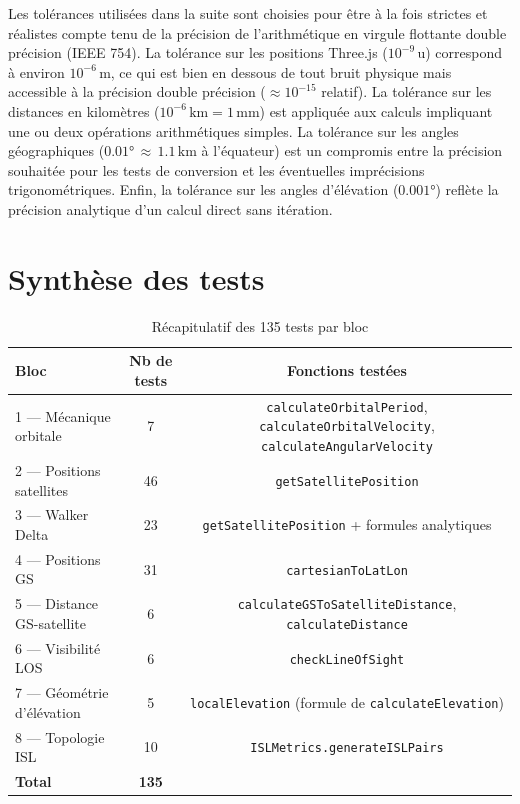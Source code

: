 \documentclass[12pt,a4paper]{article}
\begin{document}
Les tolérances utilisées dans la suite sont choisies pour être à la fois strictes et réalistes compte tenu de la précision de l'arithmétique en virgule flottante double précision (IEEE 754). La tolérance sur les positions Three.js ($10^{-9}$\,u) correspond à environ $10^{-6}\,\text{m}$, ce qui est bien en dessous de tout bruit physique mais accessible à la précision double précision ($\approx 10^{-15}$ relatif). La tolérance sur les distances en kilomètres ($10^{-6}\,\text{km} = 1\,\text{mm}$) est appliquée aux calculs impliquant une ou deux opérations arithmétiques simples. La tolérance sur les angles géographiques ($0.01°\,\approx\,1.1\,\text{km}$ à l'équateur) est un compromis entre la précision souhaitée pour les tests de conversion et les éventuelles imprécisions trigonométriques. Enfin, la tolérance sur les angles d'élévation ($0.001°$) reflète la précision analytique d'un calcul direct sans itération.

\section{Synthèse des tests}

\begin{table}[h!]
\centering
\caption{Récapitulatif des 135 tests par bloc}
\begin{tabular}{lcc}
\toprule
\textbf{Bloc} & \textbf{Nb de tests} & \textbf{Fonctions testées} \\
\midrule
1 — Mécanique orbitale        & 7  & \texttt{calculateOrbitalPeriod}, \texttt{calculateOrbitalVelocity}, \texttt{calculateAngularVelocity} \\
2 — Positions satellites      & 46 & \texttt{getSatellitePosition} \\
3 — Walker Delta              & 23 & \texttt{getSatellitePosition} + formules analytiques \\
4 — Positions GS              & 31 & \texttt{cartesianToLatLon} \\
5 — Distance GS-satellite     & 6  & \texttt{calculateGSToSatelliteDistance}, \texttt{calculateDistance} \\
6 — Visibilité LOS            & 6  & \texttt{checkLineOfSight} \\
7 — Géométrie d'élévation     & 5  & \texttt{localElevation} (formule de \texttt{calculateElevation}) \\
8 — Topologie ISL             & 10 & \texttt{ISLMetrics.generateISLPairs} \\
\midrule
\textbf{Total}                & \textbf{135} & \\
\bottomrule
\end{tabular}
\end{table}
\end{document}
